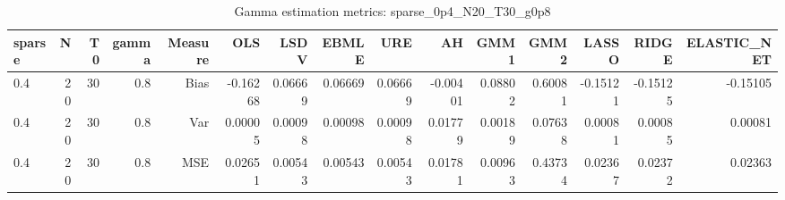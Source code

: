 \begin{table}[!htbp]\centering
\caption{Gamma estimation metrics: sparse_0p4_N20_T30_g0p8}
\label{tab:table1_sparse_0p4_N20_T30_g0p8}
\begin{tabular}{lrrrrrrrrrrrrrr}
\hline
sparse & N & T0 & gamma & Measure & OLS & LSDV & EBMLE & URE & AH & GMM1 & GMM2 & LASSO & RIDGE & ELASTIC_NET \\
\hline
0.4 & 20 & 30 & 0.8 & Bias & -0.16268 & 0.06669 & 0.06669 & 0.06669 & -0.00401 & 0.08802 & 0.60081 & -0.15121 & -0.15125 & -0.15105 \\
0.4 & 20 & 30 & 0.8 & Var & 0.00005 & 0.00098 & 0.00098 & 0.00098 & 0.01779 & 0.00189 & 0.07638 & 0.00081 & 0.00085 & 0.00081 \\
0.4 & 20 & 30 & 0.8 & MSE & 0.02651 & 0.00543 & 0.00543 & 0.00543 & 0.01781 & 0.00963 & 0.43734 & 0.02367 & 0.02372 & 0.02363 \\
\hline
\end{tabular}
\end{table}

